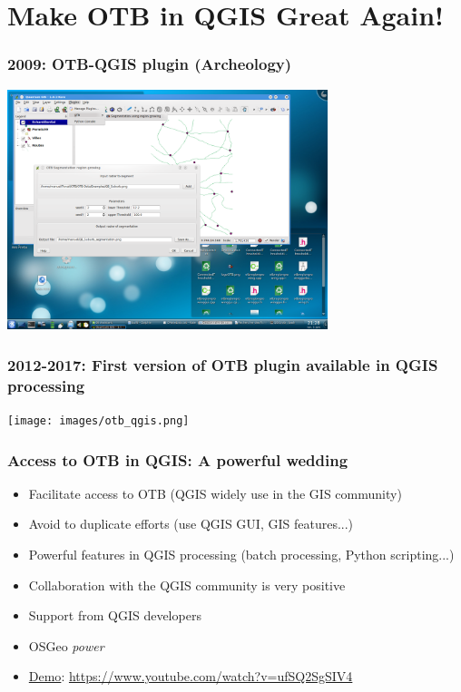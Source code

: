 \section{Make OTB in QGIS Great Again!}

\begin{frame}
\frametitle{2009: OTB-QGIS plugin (Archeology)}
\begin{minipage}[t][6cm][t]{\textwidth}
\begin{center}
\includegraphics[width=0.7\textwidth]{images/otb-qgis-2009.png}
\end{center}
\end{minipage}
\end{frame}

\begin{frame}
\frametitle{2012-2017: First version of OTB plugin available in QGIS processing}
\begin{minipage}[t][6cm][t]{\textwidth}
\begin{center}
\texttt{[image: images/otb\_qgis.png]}
\end{center}
\end{minipage}
\end{frame}

\begin{frame}
\frametitle{Access to OTB in QGIS: A powerful wedding}
\begin{itemize}
\item Facilitate access to OTB (QGIS widely use in the GIS community)
\item Avoid to duplicate efforts (use QGIS GUI, GIS features...)
\item Powerful features in QGIS processing (batch processing, Python scripting...)
\item Collaboration with the QGIS community is very positive
\item Support from QGIS developers
\item OSGeo \textit{power}
\item \href{https://www.youtube.com/watch?v=ufSQ2SgSIV4}{Demo}: \url{https://www.youtube.com/watch?v=ufSQ2SgSIV4}
\end{itemize}
\end{frame}

